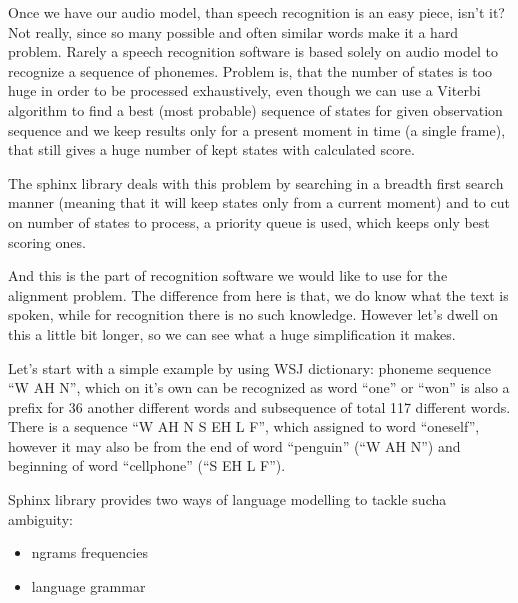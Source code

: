 \documentclass[12pt,a4paper,english]{article}
\begin{document}
\newpage

Once we have our audio model, than speech recognition is an easy piece, isn't it? \newline
Not really, since so many possible and often similar words make it a hard problem. Rarely a speech recognition software is based solely on audio model to recognize a sequence of phonemes. \newline
Problem is, that the number of states is too huge in order to be processed exhaustively, even though we can use a Viterbi algorithm to find a best (most probable) sequence of states for given observation sequence and we keep results only for a present moment in time (a single frame), that still gives a huge number
of kept states with calculated score. \newline

The sphinx library deals with this problem by searching in a breadth first search manner (meaning that it will keep states only from a current moment) and to cut on number of states to process, a priority queue is used, which keeps only best scoring ones. \newline

And this is the part of recognition software we would like to use for the alignment problem. \newline
The difference from here is that, we do know what the text is spoken, while for recognition there is no such knowledge. \newline
However let's dwell on this a little bit longer, so we can see what a huge simplification it makes. \newline

Let's start with a simple example by using WSJ dictionary: \newline
phoneme sequence “W AH N”, which  on it's own can be recognized as word “one” or “won” is also a prefix for 36 another different words and subsequence of total 117 different words. \newline
There is a sequence “W AH N S EH L F”, which assigned to word “oneself”, however it may also be from the end of word “penguin” (“W AH N”) and beginning of word “cellphone” (“S EH L F”). \newline

Sphinx library provides two ways of language modelling to tackle sucha ambiguity:
\begin{itemize}
    \item ngrams frequencies
    \item language grammar
\end{itemize}
\end{document}

